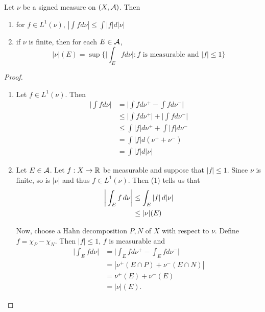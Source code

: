 \documentclass{book}
\begin{document}
	\begin{ex}  
		Let $\nu$ be a signed measure on $(X, \mathcal{A})$. Then 
		\begin{enumerate}
			\item for $f \in L^1(\nu)$, $|\int f d \nu| \leq \int |f| d |\nu|$
			\item if $\nu$ is finite, then for each $E \in \mathcal{A}$, $$|\nu|(E) = \sup \bigg\{\bigg|\int_E f d \nu \bigg|: f  \text{ is measurable and } |f| \leq 1 \bigg \}$$
		\end{enumerate}
	\end{ex}
	
	\begin{proof}
		\begin{enumerate}
			\item Let $f \in L^1(\nu)$. Then 
			\begin{align*}
				\bigg|\int f d \nu \bigg| 
				&= \bigg|\int f d \nu^+ - \int f d \nu^-\bigg|\\
				& \leq \bigg|\int f d \nu^+\bigg| + \bigg|\int f d \nu^-\bigg|\\
				& \leq \int |f| d\nu^+ + \int |f| d\nu^-\\
				&= \int |f| d (\nu^+ + \nu^-)\\
				&= \int |f| d |\nu|
			\end{align*}
			
			\item Let $E \in \mathcal{A}$. Let $f:X \rightarrow \mathbb{R}$ be measurable and suppose that $|f| \leq 1$. Since $\nu$ is finite, so is $|\nu|$ and thus $f \in L^1(\nu)$. Then (1) tells us that 
			\begin{align*}
				\bigg |\int_E f \, d \nu \bigg| 
				& \leq \int_E |f| \, d |\nu|\\
				& \leq |\nu|(E) 
			\end{align*}
			
			Now, choose a Hahn decomposition $P,N$ of $X$ with respect to $\nu$. Define $f = \chi_{P} - \chi_{N}$. Then $|f| \leq 1$, $f$ is measurable and 
			\begin{align*}
				\bigg|\int_E f d\nu\bigg|
				&= \bigg|\int_E f d \nu^+ - \int_E f d \nu^-\bigg|\\
				&= | \nu^+(E \cap P) + \nu^-(E \cap N)|\\
				&= \nu^+(E) + \nu^-(E)\\
				&= |\nu|(E).
			\end{align*}
			
		\end{enumerate}
	\end{proof}
	
\end{document}
